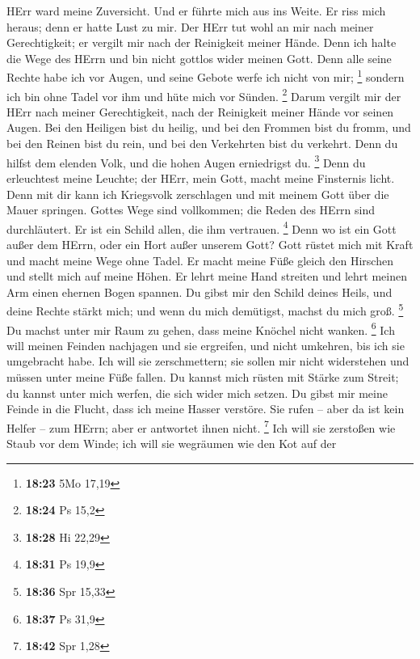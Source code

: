 HErr ward meine Zuversicht.  Und er führte mich aus ins
Weite. Er riss mich heraus; denn er hatte Lust zu mir.  Der
HErr tut wohl an mir nach meiner Gerechtigkeit; er vergilt mir nach der
Reinigkeit meiner Hände.  Denn ich halte die Wege des HErrn
und bin nicht gottlos wider meinen Gott.  Denn alle seine
Rechte habe ich vor Augen, und seine Gebote werfe ich nicht von mir;
\footnote{\textbf{18:23} 5Mo 17,19}  sondern ich bin ohne
Tadel vor ihm und hüte mich vor Sünden. \footnote{\textbf{18:24} Ps 15,2}
 Darum vergilt mir der HErr nach meiner Gerechtigkeit, nach
der Reinigkeit meiner Hände vor seinen Augen.  Bei den
Heiligen bist du heilig, und bei den Frommen bist du fromm,
 und bei den Reinen bist du rein, und bei den Verkehrten
bist du verkehrt.  Denn du hilfst dem elenden Volk, und die
hohen Augen erniedrigst du. \footnote{\textbf{18:28} Hi 22,29}
 Denn du erleuchtest meine Leuchte; der HErr, mein Gott,
macht meine Finsternis licht.  Denn mit dir kann ich
Kriegsvolk zerschlagen und mit meinem Gott über die Mauer springen.
 Gottes Wege sind vollkommen; die Reden des HErrn sind
durchläutert. Er ist ein Schild allen, die ihm vertrauen. \footnote{\textbf{18:31}
  Ps 19,9}  Denn wo ist ein Gott außer dem HErrn, oder ein
Hort außer unserem Gott?  Gott rüstet mich mit Kraft und
macht meine Wege ohne Tadel.  Er macht meine Füße gleich
den Hirschen und stellt mich auf meine Höhen.  Er lehrt
meine Hand streiten und lehrt meinen Arm einen ehernen Bogen spannen.
 Du gibst mir den Schild deines Heils, und deine Rechte
stärkt mich; und wenn du mich demütigst, machst du mich groß.
\footnote{\textbf{18:36} Spr 15,33}  Du machst unter mir
Raum zu gehen, dass meine Knöchel nicht wanken. \footnote{\textbf{18:37}
  Ps 31,9}  Ich will meinen Feinden nachjagen und sie
ergreifen, und nicht umkehren, bis ich sie umgebracht habe.
 Ich will sie zerschmettern; sie sollen mir nicht
widerstehen und müssen unter meine Füße fallen.  Du kannst
mich rüsten mit Stärke zum Streit; du kannst unter mich werfen, die sich
wider mich setzen.  Du gibst mir meine Feinde in die
Flucht, dass ich meine Hasser verstöre.  Sie rufen -- aber
da ist kein Helfer -- zum HErrn; aber er antwortet ihnen nicht.
\footnote{\textbf{18:42} Spr 1,28}  Ich will sie zerstoßen
wie Staub vor dem Winde; ich will sie wegräumen wie den Kot auf der
